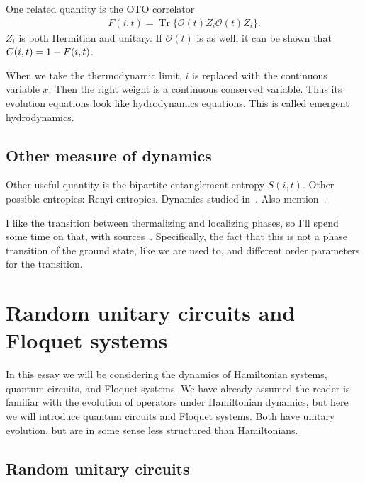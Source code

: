 \documentclass[a4paper,12pt]{article}
\renewcommand{\cal}{\mathcal}
\newcommand{\note}[1]{{\color{red}{#1}}}
\DeclareMathOperator{\Tr}{Tr}
\let\Re\relax
\DeclareMathOperator{\Re}{Re}
\begin{document}
One related quantity is the OTO correlator 
\begin{align}
F(i,t) = \Tr\{\cal{O}(t) Z_i\cal{O}(t) Z_i\}.
\end{align}
$Z_i$ is both Hermitian and unitary. If $\cal{O}(t)$ is as well, it can be shown that $C(i,t)=1-\Re F(i,t)$.

When we take the thermodynamic limit, $i$ is replaced with the continuous variable $x$. Then the right weight is a continuous conserved variable. Thus its evolution equations look like hydrodynamics equations. This is called emergent hydrodynamics. 

\subsection{Other measure of dynamics} \label{sub:other}

\note{Is any of this useful or necessary?}
Other useful quantity is the bipartite entanglement entropy $S(i,t)$.
Other possible entropies: Renyi entropies.
Dynamics studied in~\cite{RakovskyDiff, HuangRenyi}.
Also mention~\cite{JonayEntanglement}.

I like the transition between thermalizing and localizing phases, so I'll spend some time on that, with sources~\cite{PalHuse, KhemaniCP}. Specifically, the fact that this is not a phase transition of the ground state, like we are used to, and different order parameters for the transition. 


\section{Random unitary circuits and Floquet systems} \label{sec:circuits}

In this essay we will be considering the dynamics of Hamiltonian systems, quantum circuits, and Floquet systems. We have already assumed the reader is familiar with the evolution of operators under Hamiltonian dynamics, but here we will introduce quantum circuits and Floquet systems. Both have unitary evolution, but are in some sense less structured than Hamiltonians.

\note{Define ``physical" systems, disorder realization.}

\note{Haar measure}

\subsection{Random unitary circuits} \label{sub:ruc}
\end{document}
